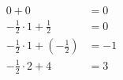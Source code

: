 \documentclass[preview]{standalone}
\begin{document}
\begin{align*}
0 + 0 & = 0\\ - \frac{1}{2}\cdot1 + \frac{1}{2} & = 0 \\ -\frac{1}{2}\cdot1 + (-\frac{1}{2}) & = -1 \\ - \frac{1}{2}\cdot2 + 4  & = 3 \\
\end{align*}
\end{document}
